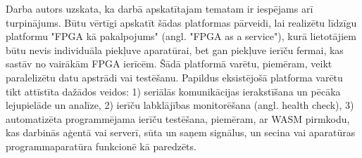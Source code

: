 Darba autors uzskata, ka darbā apskatītajam tematam ir iespējams arī
turpinājums. Būtu vērtīgi apskatīt šādas platformas pārveidi, lai realizētu
līdzīgu platformu "FPGA kā pakalpojums" (angl. "FPGA as a service"), kurā
lietotājiem būtu nevis individuāla piekļuve aparatūrai, bet gan piekļuve ierīču
fermai, kas sastāv no vairākām FPGA ierīcēm. Šādā platformā varētu, piemēram,
veikt paralelizētu datu apstrādi vai testēšanu. Papildus eksistējošā platforma
varētu tikt attīstīta dažādos veidos: 1) seriālās komunikācijas ierakstīšana un
pēcāka lejupielāde un analīze, 2) ierīču labklājības monitorēšana (angl. health
check), 3) automatizēta programmējama ierīču testēšana, piemēram, ar WASM
pirmkodu, kas darbinās aģentā vai serverī, sūta un saņem signālus, un secina vai
aparatūras programmaparatūra funkcionē kā paredzēts.
